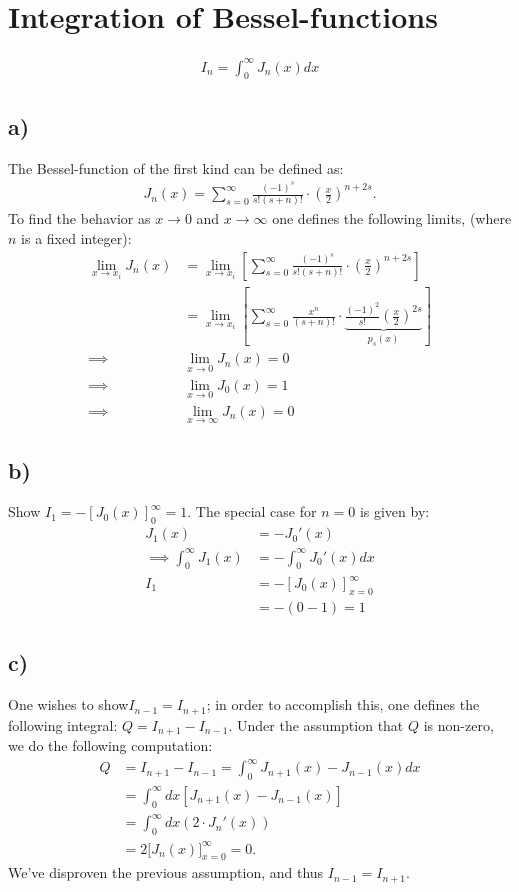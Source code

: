 \documentclass{article}
\begin{document}
\section*{Integration of Bessel-functions}
\begin{align*}
    I_n = \int_0^\infty J_n(x)dx
\end{align*}
\subsection*{a)}
The Bessel-function of the first kind can be defined as:
\begin{align*}
    J_n(x) = \sum_{s =0}^\infty \frac{(-1)^s}{s!(s+n)!}\cdot\left(\frac{x}{2}\right)^{n+2s}.
\end{align*}To find the behavior as $x\to0$ and $x\to\infty$ one defines the following limits, (where $n$ is a fixed integer):
\begin{align*}
    \lim_{x\to x_i}J_n(x) &= \lim_{x\to x_i}\left[\sum_{s =0}^\infty \frac{(-1)^s}{s!(s+n)!}\cdot\left(\frac{x}{2}\right)^{n+2s}\right]\\
    &=\lim_{x\to x_i}\left[\sum_{s = 0}^\infty \frac{x^{n}}{(s+n)!}\cdot\underbrace{\frac{(-1)^2}{s!}\left(\frac{x}{2}\right)^{2s}}_{p_s(x)}\right]\\
    \implies& \lim_{x\to 0} J_n(x) = 0\\
    \implies& \lim_{x\to 0} J_0(x) = 1\\
    \implies& \lim_{x\to \infty} J_n(x) = 0
\end{align*}

\subsection*{b)}
Show $I_1 = -[J_0(x)]_{0}^\infty=1$. The special case for $n =0$ is given by:
\begin{align*}
    J_1(x)&=-J_0'(x)\\
    \implies \int_0^\infty J_1(x) &= -\int_0^\infty J_0'(x)dx\\
    I_1&=-\left[J_0(x)\right]_{x = 0}^\infty \\
    &= -(0 - 1) = 1
\end{align*}

\subsection*{c)}
One wishes to show$I_{n-1}=I_{n+1}$; in order to accomplish this, one defines the following integral: $Q = I_{n+1}-I_{n-1}$. Under the assumption that $Q$ is non-zero, we do the following computation:
\begin{align*}
    Q &= I_{n+1}-I_{n-1} = \int_0^\infty J_{n+1}(x) - J_{n-1}(x)dx\\
    &=\int_0^\infty dx\left[J_{n+1}(x) - J_{n-1}(x)\right]\\
    &=\int_0^\infty dx \left(2\cdot J_n'(x)\right)\\
    &=2\Big[J_n(x)\Big]_{x = 0}^\infty = 0.
\end{align*}
We've disproven the previous assumption, and thus $I_{n-1} = I_{n+1}$.
\end{document}
